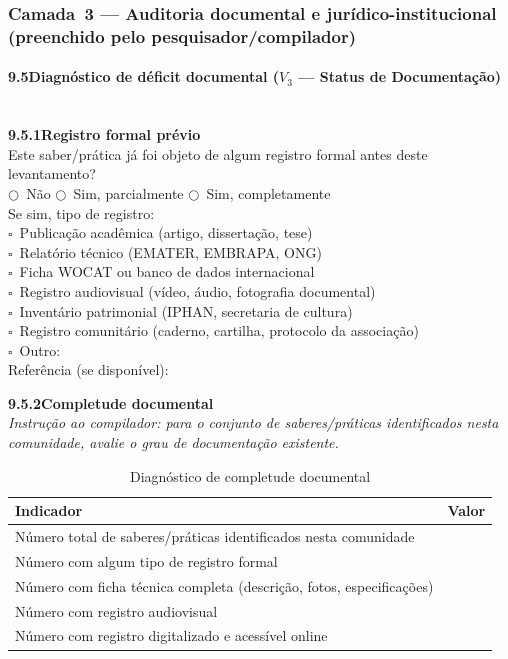 \subsubsection*{Camada~3 --- Auditoria documental e jurídico-institucional (preenchido pelo pesquisador/compilador)}

\paragraph{9.5\quad Diagnóstico de déficit documental ($V_3$ --- Status de Documentação)}~\\[4pt]

\noindent\textbf{9.5.1\quad Registro formal prévio}\\[2pt]
Este saber/prática já foi objeto de algum registro formal antes deste levantamento?\\
$\bigcirc$~Não \quad $\bigcirc$~Sim, parcialmente \quad $\bigcirc$~Sim, completamente\\[2pt]
Se sim, tipo de registro:\\
$\square$~Publicação acadêmica (artigo, dissertação, tese)\\
$\square$~Relatório técnico (EMATER, EMBRAPA, ONG)\\
$\square$~Ficha WOCAT ou banco de dados internacional\\
$\square$~Registro audiovisual (vídeo, áudio, fotografia documental)\\
$\square$~Inventário patrimonial (IPHAN, secretaria de cultura)\\
$\square$~Registro comunitário (caderno, cartilha, protocolo da associação)\\
$\square$~Outro: \dotfill\\[2pt]
Referência (se disponível): \dotfill

\medskip\noindent\textbf{9.5.2\quad Completude documental}\\[2pt]
\textit{Instrução ao compilador: para o conjunto de saberes/práticas identificados nesta comunidade, avalie o grau de documentação existente.}

\begin{table}[htbp]
\centering\small
\caption{Diagnóstico de completude documental}
\label{tab:app_completude}
\begin{tabular}{p{9cm}c}
\toprule
\textbf{Indicador} & \textbf{Valor} \\
\midrule
Número total de saberes/práticas identificados nesta comunidade & \\
Número com algum tipo de registro formal & \\
Número com ficha técnica completa (descrição, fotos, especificações) & \\
Número com registro audiovisual & \\
Número com registro digitalizado e acessível online & \\
\bottomrule
\end{tabular}
\end{table}

